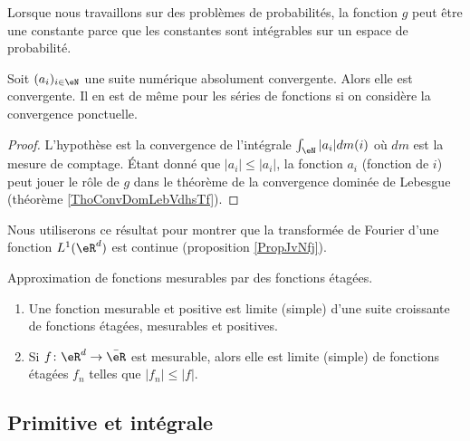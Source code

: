 \begin{remark}
    Lorsque nous travaillons sur des problèmes de probabilités, la fonction \( g\) peut être une constante parce que les constantes sont intégrables sur un espace de probabilité.
\end{remark}

\begin{corollary}       \label{CorCvAbsNormwEZdRc}
    Soit \( (a_i)_{i\in \eN}\) une suite numérique absolument convergente. Alors elle est convergente. Il en est de même pour les séries de fonctions si on considère la convergence ponctuelle.
\end{corollary}

\begin{proof}
    L'hypothèse est la convergence de l'intégrale \( \int_{\eN}| a_i |dm(i)\) où \( dm\) est la mesure de comptage. Étant donné que \( | a_i |\leq | a_i |\), la fonction \( a_i\) (fonction de \( i\)) peut jouer le rôle de \( g\) dans le théorème de la convergence dominée de Lebesgue (théorème \ref{ThoConvDomLebVdhsTf}).
\end{proof}
Nous utiliserons ce résultat pour montrer que la transformée de Fourier d'une fonction \( L^1(\eR^d)\) est continue (proposition \ref{PropJvNfj}).

\begin{proposition} \label{PropUXjnwLf}
    Approximation de fonctions mesurables par des fonctions étagées.
    \begin{enumerate}
        \item
            Une fonction mesurable et positive est limite (simple) d'une suite croissante de fonctions étagées, mesurables et positives.
        \item
            Si \( f\colon \eR^d\to \bar \eR\) est mesurable, alors elle est limite (simple) de fonctions étagées \( f_n\) telles que \( | f_n |\leq | f |\).
    \end{enumerate}
\end{proposition}

\subsection{Primitive et intégrale}

